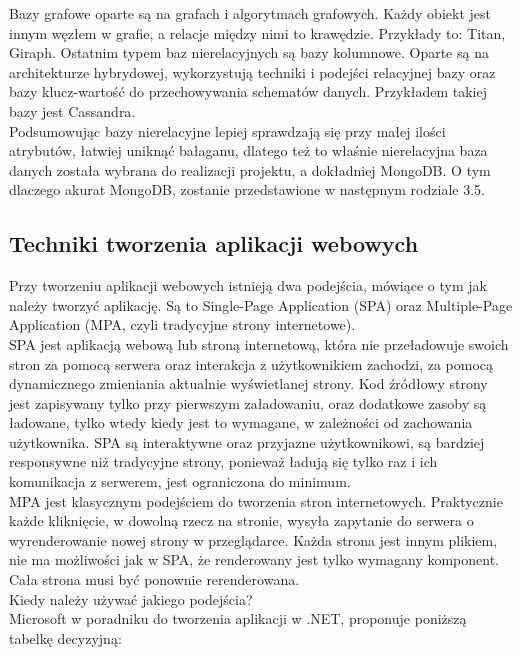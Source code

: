 \documentclass[12pt]{article}
\begin{document}
\begin{sloppypar}
{{    Bazy grafowe oparte są na grafach i algorytmach grafowych. Każdy obiekt jest innym węzłem w grafie, a relacje między nimi to krawędzie. Przykłady to: Titan, Giraph.
    Ostatnim typem baz nierelacyjnych są bazy kolumnowe. Oparte są na architekturze hybrydowej, wykorzystują techniki i podejści relacyjnej bazy oraz bazy klucz-wartość 
    do przechowywania schematów danych. Przykładem takiej bazy jest Cassandra.\\
    Podsumowując bazy nierelacyjne lepiej sprawdzają się przy małej ilości atrybutów, łatwiej uniknąć bałaganu, dlatego też to właśnie nierelacyjna baza danych została wybrana 
    do realizacji projektu, a dokładniej MongoDB. O tym dlaczego akurat MongoDB, zostanie przedstawione w następnym rodziale 3.5.
  }
  \subsection{Techniki tworzenia aplikacji webowych}
  {
    Przy tworzeniu aplikacji webowych istnieją dwa podejścia, mówiące o tym jak należy tworzyć aplikację. 
    Są to Single-Page Application (SPA) oraz Multiple-Page Application (MPA, czyli tradycyjne strony internetowe). \\
    SPA jest aplikacją webową lub stroną internetową, która nie przeładowuje swoich stron za pomocą serwera oraz interakcja z użytkownikiem zachodzi, 
    za pomocą dynamicznego zmieniania aktualnie wyświetlanej strony. Kod źródłowy strony jest zapisywany tylko przy pierwszym załadowaniu, oraz 
    dodatkowe zasoby są ładowane, tylko wtedy kiedy jest to wymagane, w zależności od zachowania użytkownika. 
    SPA są interaktywne oraz przyjazne użytkownikowi, są bardziej responsywne niż tradycyjne strony, ponieważ ładują się tylko raz i ich komunikacja z serwerem,
    jest ograniczona do minimum. \cite{spa-conference} \\
    MPA jest klasycznym podejściem do tworzenia stron internetowych. 
    Praktycznie każde kliknięcie, w dowolną rzecz na stronie, wysyła zapytanie do serwera o wyrenderowanie nowej strony w przeglądarce.
    Każda strona jest innym plikiem, nie ma możliwości jak w SPA, że renderowany jest tylko wymagany komponent. Cała strona musi być ponownie rerenderowana. \\
    Kiedy należy używać jakiego podejścia? \\
    Microsoft w poradniku do tworzenia aplikacji w .NET, proponuje poniższą tabelkę decyzyjną\cite{mc-spa}:
    \begin{center}
      \begin{table}

\end{table}
\end{center}}}
\end{sloppypar}
\end{document}
